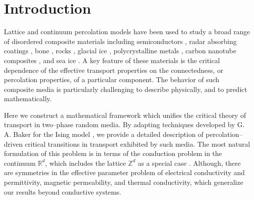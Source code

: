 \documentclass[english,12pt,jmp,graphicx]{revtex4-1}
\begin{document}

\maketitle %

%
\section{Introduction}\label{sec:Introduction}
%
Lattice and continuum percolation models have been used to study a
broad range of disordered composite materials including semiconductors 
\cite{Efros-84}, radar absorbing coatings \cite{Kusy:N-58},
bone \cite{Sasaki:JTB:25,Golden:JoB:337}, rocks
\cite{Bourbie:JGR-11524,Broadbent:PCPS-629}, 
glacial ice \cite{Enting:1985:LSM}, polycrystalline metals
\cite{Chen:PRL:2007}, carbon nanotube composites
\cite{Kyrylyuk:PNAS:2008}, and sea ice \cite{Golden:S-2238}. A key
feature of these materials is the critical dependence of the effective
transport properties on the connectedness, or percolation properties,
of a particular component. The behavior of such composite media is
particularly challenging to describe physically, and to predict
mathematically.  

Here we construct a mathematical framework which unifies the critical
theory of transport in two--phase random media. By adapting techniques
developed by G. A. Baker for the Ising model \cite{Baker-1990}, we
provide a detailed description of percolation--driven critical
transitions in transport exhibited by such media. The most natural
formulation of this problem is in terms of the conduction problem in
the continuum $\mathbb{R}^d$, which includes the lattice
$\mathbb{Z}^d$ as a special case \cite{Golden:JMP-5627,Golden:CMP-473}. 
Although, there are symmetries \cite{MILTON:2002:TC} in the effective
parameter problem of electrical conductivity and permittivity,
magnetic permeability, and thermal conductivity, which generalize our
results beyond conductive systems. 
\end{document}
